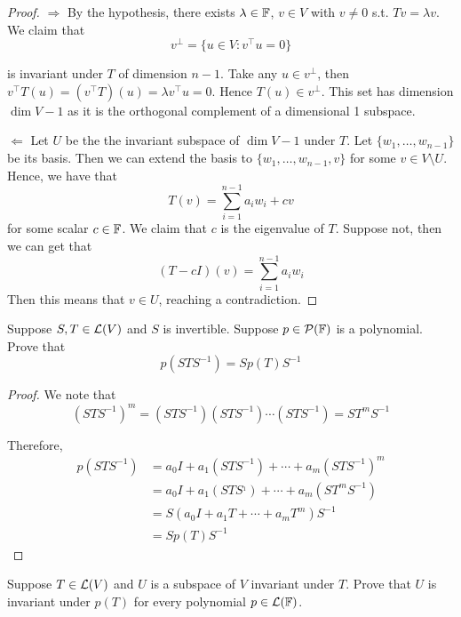 \documentclass{extarticle}
\begin{document}
\begin{proof}

\(\Rightarrow\) By the hypothesis, there exists \(\lambda \in \mathbb{F}\), \(v \in V\) with \(v \neq 0\) s.t. 
\(Tv = \lambda v\). We claim that 
\[v^\perp = \{u \in V \colon v^\top u = 0\}\]

is invariant under \(T\) of dimension \(n - 1\). Take any \(u \in v^\perp\), then 
\(v^\top T(u) = (v^\top T)(u) = \lambda v^\top u = 0\). Hence \(T(u) \in v^\perp\). This set has 
dimension \(\dim V - 1\) as it is the orthogonal complement of a dimensional 1 subspace. 

\(\Leftarrow\) Let \(U\) be the the invariant subspace of \(\dim V - 1\) under \(T\). Let 
\(\{w_1, \ldots, w_{n-1}\}\) be its basis. Then we can extend the basis to \(\{w_1, \ldots, w_{n-1}, v\}\)
for some \(v \in V \setminus U\). Hence, we have that 
\[T(v) = \sum_{i=1}^{n-1} a_i w_i + c v\]
for some scalar \(c \in \mathbb{F}\). We claim that \(c\) is the eigenvalue of \(T\). Suppose not, then we can get that 
\[(T - cI)(v) = \sum_{i=1}^{n-1} a_i w_i\]
Then this means that \(v \in U\), reaching a contradiction.
\end{proof}

\begin{problem}{40}
    Suppose \(S, T \in \mathcal{L}(V)\) and \(S\) is invertible. Suppose \(p \in \mathcal{P}(\mathbb{F})\) is a polynomial. Prove that 
    \[p(STS^{-1}) = S p(T)S^{-1}\]
\end{problem}

\begin{proof}
We note that 
\[(STS^{-1})^m = (STS^{-1})(STS^{-1}) \cdots (STS^{-1}) = ST^m S^{-1}\]

Therefore, 
\begin{align*}
    p(STS^{-1})
    &= a_0I + a_1(STS^{-1}) + \cdots + a_m(STS^{-1})^m \\ 
    &= a_0I + a_1(STS^{_1}) + \cdots + a_m(ST^mS^{-1}) \\ 
    &= S(a_0 I + a_1 T + \cdots + a_m T^m)S^{-1} \\ 
    &= Sp(T)S^{-1}
\end{align*}
\end{proof}

\begin{problem}{41}
    Suppose \(T \in \mathcal{L}(V)\) and \(U\) is a subspace of \(V\) invariant under \(T\). Prove that \(U\) is invariant 
    under \(p(T)\) for every polynomial \(p \in \mathcal{L}(\mathbb{F})\).
\end{problem}
\end{document}
